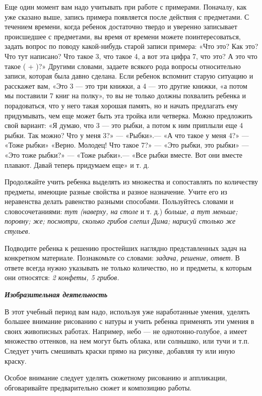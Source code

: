 \documentclass[a5paper]{book}
\renewcommand{\emph}[1]{\textit{#1}}
\begin{document}
Еще один момент вам надо учитывать при работе с примерами. Поначалу, как
уже сказано выше, запись примера появляется после действия с предметами.
С течением времени, когда ребенок достаточно твердо и уверенно
записывает происшедшее с предметами, вы время от времени можете
поинтересоваться, задать вопрос по поводу какой-нибудь старой записи
примера: «Что это? Как это? Что тут написано? Что такое 3, что такое 4,
а вот эта цифра 7, что это? А это что такое ( + )?» Другими словами,
задаете всякого рода вопросы относительно записи, которая была давно
сделана. Если ребенок вспомнит старую ситуацию и расскажет вам, «Это 3
--- это три книжки, а 4 --- это другие книжки, «а потом мы поставили 7
книг на полку», то вы не только должны похвалить ребенка и порадоваться,
что у него такая хорошая память, но и начать предлагать ему придумывать,
чем еще может быть эта тройка или четверка. Можно предложить свой
вариант: «Я думаю, что 3 --- это рыбки, а потом к ним приплыли еще 4
рыбки. Так можно? Что у меня 3?» --- «Рыбки».--- «А что такое у меня 4?»
--- «Тоже рыбки» «Верно. Молодец! Что такое 7?» --- «Это рыбки, это
рыбки» --- «Это тоже рыбки?» --- «Тоже рыбки».--- «Все рыбки вместе. Вот
они вместе плавают. Давай теперь придумаем еще» и т. д.

Продолжайте учить ребенка выделять из множества и сопоставлять по
количеству предметы, имеющие разные свойства и разное назначение. Учите
его из неравенства делать равенство разными способами. Пользуйтесь
словами и словосочетаниями: \emph{тут (наверху, на столе} и т. д.)
\emph{больше, а тут меньше; поровну; же; посмотри, сколько грибов слепил
Дима; нарисуй столько же стульев.}

Подводите ребенка к решению простейших наглядно представленных задач на
конкретном материале. Познакомьте со словами: \emph{задача, решение,
ответ.} В ответе всегда нужно указывать не только количество, но и
предметы, к которым они относятся: \emph{2 конфеты, 5 грибов.}

\emph{\textbf{Изобразительная деятельность}}

В этот учебный период вам надо, используя уже наработанные умения,
уделять большее внимание рисованию с натуры и учить ребенка применять
эти умения в своих живописных работах. Например, небо --- не
однотонно-голубое, а имеет множество оттенков, на нем могут быть облака,
или солнышко, или тучи и т.п. Следует учить смешивать краски прямо на
рисунке, добавляя ту или иную краску.

Особое внимание следует уделять сюжетному рисованию и аппликации,
обговаривайте предварительно сюжет и композицию работы.
\end{document}
